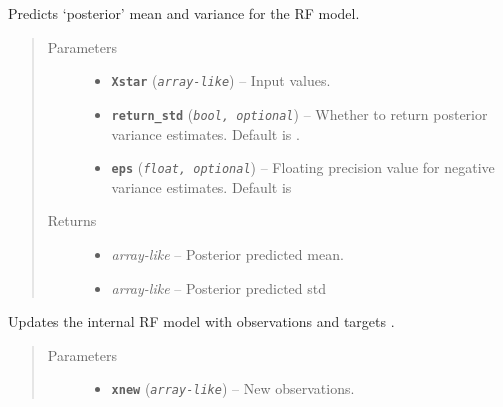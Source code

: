 \documentclass[letterpaper,10pt,english]{sphinxmanual}
\begin{document}
\begin{fulllineitems}
\begin{fulllineitems}
\label{pyGPGO.surrogates.RandomForest:pyGPGO.surrogates.RandomForest.ExtraForest.predict}
Predicts `posterior' mean and variance for the RF model.
\begin{quote}\begin{description}
\item[{Parameters}] \leavevmode\begin{itemize}
\item {} 
\textbf{\texttt{Xstar}} (\emph{\texttt{array-like}}) -- Input values.

\item {} 
\textbf{\texttt{return\_std}} (\emph{\texttt{bool, optional}}) -- Whether to return posterior variance estimates. Default is .

\item {} 
\textbf{\texttt{eps}} (\emph{\texttt{float, optional}}) -- Floating precision value for negative variance estimates. Default is 

\end{itemize}

\item[{Returns}] \leavevmode
\begin{itemize}
\item {} 
\emph{array-like} -- Posterior predicted mean.

\item {} 
\emph{array-like} -- Posterior predicted std

\end{itemize}


\end{description}\end{quote}

\end{fulllineitems}


\begin{fulllineitems}
\label{pyGPGO.surrogates.RandomForest:pyGPGO.surrogates.RandomForest.ExtraForest.update}
Updates the internal RF model with observations  and targets .
\begin{quote}\begin{description}
\item[{Parameters}] \leavevmode\begin{itemize}
\item {} 
\textbf{\texttt{xnew}} (\emph{\texttt{array-like}}) -- New observations.


\end{itemize}
\end{description}
\end{quote}
\end{fulllineitems}
\end{fulllineitems}
\end{document}
